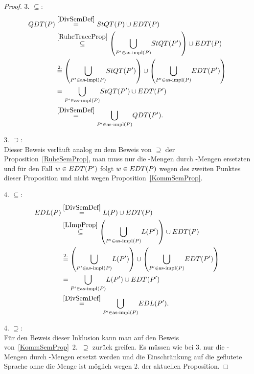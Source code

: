 \begin{proof}
  3. \glqq$\subseteq$\grqq{}:
  \begin{align*}
    QDT (P)&\overset{\ref{DivSemDef}}{=} StQT (P)\cup EDT (P)\\
    &\overset{\ref{RuheTraceProp}}{\subseteq} \left(\underset{P'\in \mathrm{as}\text{-}\mathrm{impl}
    (P)}{\bigcup} StQT (P')\right)\cup EDT (P)\\
    &\overset{2.}{=} \left(\underset{P'\in \mathrm{as}\text{-}\mathrm{impl} (P)}{\bigcup} StQT
    (P')\right)\cup \left(\underset{P'\in \mathrm{as}\text{-}\mathrm{impl} (P)}{\bigcup} EDT
    (P')\right)\\
    &= \underset{P'\in \mathrm{as}\text{-}\mathrm{impl} (P)}{\bigcup} StQT (P') \cup EDT (P')\\
    &\overset{\ref{DivSemDef}}{=} \underset{P'\in\mathrm{as}\text{-}\mathrm{impl} (P)}{\bigcup} QDT
    (P').\\
  \end{align*}

  3. \glqq$\supseteq$\grqq{}:\\
  Dieser Beweis verläuft analog zu dem Beweis von \glqq$\supseteq$\grqq{} der
  Proposition~\ref{RuheSemProp}, man muss nur die \ET{}-Mengen durch
  \EDT{}-Mengen ersetzten und für den Fall $w\in EDT (P')$ folgt $w\in EDT (P)$
  wegen des zweiten Punktes dieser Proposition und nicht wegen
  Proposition~\ref{KommSemProp}.

  4. \glqq$\subseteq$\grqq{}:
  \begin{align*}
    EDL (P)&\overset{\ref{DivSemDef}}{=} L (P)\cup EDT (P)\\
    &\overset{\ref{LImpProp}}{\subseteq} \left(\underset{P'\in \mathrm{as}\text{-}\mathrm{impl}
    (P)}{\bigcup} L (P')\right) \cup EDT (P)\\
    &\overset{2.}{=} \left(\underset{P'\in \mathrm{as}\text{-}\mathrm{impl} (P)}{\bigcup} L (P')\right)
    \cup \left(\underset{P'\in \mathrm{as}\text{-}\mathrm{impl} (P)}{\bigcup} EDT (P')\right)\\
    &= \underset{P'\in \mathrm{as}\text{-}\mathrm{impl} (P)}{\bigcup} L (P') \cup EDT (P')\\
    &\overset{\ref{DivSemDef}}{=} \underset{P'\in\mathrm{as}\text{-}\mathrm{impl} (P)}{\bigcup} EDL
    (P').\\
  \end{align*}

  4. \glqq$\supseteq$\grqq{}:\\
  Für den Beweis dieser Inklusion kann man auf den Beweis
  von~\ref{KommSemProp}~2.~\glqq$\supseteq$\grqq{} zurück greifen. Es müssen
  wie bei 3. nur die \ET{}-Mengen durch \EDT{}-Mengen ersetzt werden und die
  Einschränkung auf die geflutete Sprache ohne die Menge \EDT{} ist möglich
  wegen 2. der aktuellen Proposition.
\end{proof}

